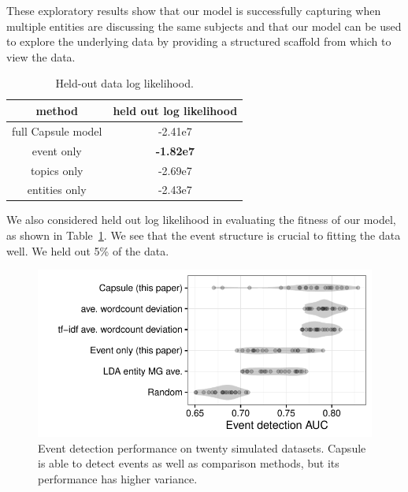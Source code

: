 These exploratory results show that our model is successfully capturing when multiple entities are discussing the same subjects and that our model can be used to explore the underlying data by providing a structured scaffold from which to view the data.

\begin{table}[h]
\centering
\begin{tabular}{cc}
\toprule
method & held out log likelihood \\
\midrule
full Capsule model & -2.41e7 \\
event only & \textbf{-1.82e7} \\
topics only & -2.69e7 \\
entities only & -2.43e7 \\
\bottomrule
\end{tabular}
\label{tab:loglikelihood}
\caption{Held-out data log likelihood.}
\end{table}
We also considered held out log likelihood in evaluating the fitness of our model, as shown in Table~\ref{tab:loglikelihood}.  We see that the event structure is crucial to fitting the data well.  We held out 5\% of the data.



\begin{figure}[h]
\centering
\includegraphics[width=\linewidth]{fig/sim_eventdetect.pdf}
\caption{Event detection performance on twenty simulated datasets.  Capsule is able to detect events as well as comparison methods, but its performance has higher variance.}
\label{fig:sim_eventdetect}
\end{figure}

